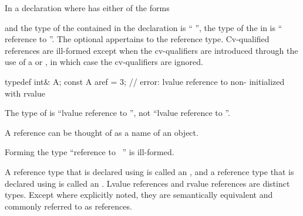 \pnum
In a declaration
where
has either of the forms
\begin{ncsimplebnf}
\terminal{\&}  \br
\terminal{\&\&}  
\end{ncsimplebnf}
and the type of the contained  in the declaration
is ``
'',
the type of the  in
is `` reference to
''.
The optional  appertains to the reference type.
Cv-qualified references are ill-formed except when the cv-qualifiers
are introduced through the use of a
 or
,
in which case the cv-qualifiers are ignored.
\begin{example}
\begin{codeblock}
typedef int& A;
const A aref = 3;   // error: lvalue reference to non- initialized with rvalue
\end{codeblock}

The type of
is ``lvalue reference to '',
not ``lvalue reference to ''.
\end{example}
\begin{note}
A reference can be thought of as a name of an object.
\end{note}
%
Forming the type
``reference to \cv{}~''
is ill-formed.


\pnum
A reference type that is declared using \tcode{\&} is called an
, and a reference type that
is declared using \tcode{\&\&} is called an
. Lvalue references and
rvalue references are distinct types. Except where explicitly noted, they are
semantically equivalent and commonly referred to as references.

